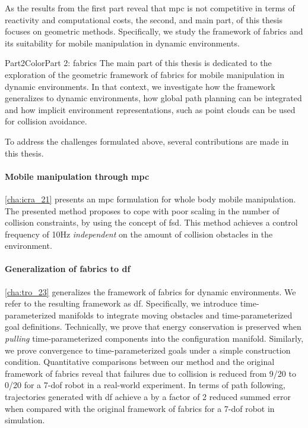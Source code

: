 As the results from the first part reveal that \ac{mpc} is 
not competitive in terms of reactivity and computational
costs, the second, and main part, of this thesis focuses on
geometric methods. Specifically, we study the framework
of \acl{fabrics} and its suitability for mobile manipulation
in dynamic environments.
%
\begin{textbox}{Part2Color}{Part 2: \acl{fabrics}}
  The main part of this thesis is dedicated to the
  exploration of the geometric framework of \ac{fabrics} for
  mobile manipulation in dynamic environments. In that
  context, we investigate how the framework generalizes to
  dynamic environments, how global path planning can be
  integrated and how implicit environment representations,
  such as point clouds can be used for collision avoidance.
\end{textbox}

To address the challenges formulated above, several
contributions are made in this thesis.

\paragraph{Mobile manipulation through \ac{mpc}}
\cref{cha:icra_21} presents an \ac{mpc} formulation for
whole body mobile manipulation. The presented method proposes to cope
with poor scaling in the number of collision constraints, by
using the concept of \ac{fsd}. This method achieves a
control frequency of 10Hz \textit{independent} on the amount
of collision obstacles in the environment.

\paragraph{Generalization of \ac{fabrics} to \ac{df}}
\cref{cha:tro_23} generalizes the framework of \ac{fabrics}
for dynamic environments. We refer to the resulting
framework as \ac{df}. Specifically, we introduce
time\hyp{}parameterized manifolds to integrate moving
obstacles and time\hyp{}parameterized goal definitions.
Technically,
we prove that energy conservation is preserved when
\textit{pulling} time\hyp{}parameterized components into
the configuration manifold. 
Similarly, we prove convergence to
time\hyp{}parameterized goals under a simple construction
condition. Quantitative comparisons between our method
and the original framework of \ac{fabrics} reveal
that failures due to collision is reduced from 9/20
to 0/20 for a 7-\ac{dof} robot in a real-world experiment.
In terms of path following, trajectories generated
with \ac{df} achieve a by a factor of 2 reduced summed error 
when compared with the original framework of
\ac{fabrics} for a 7-\ac{dof} robot in simulation.


